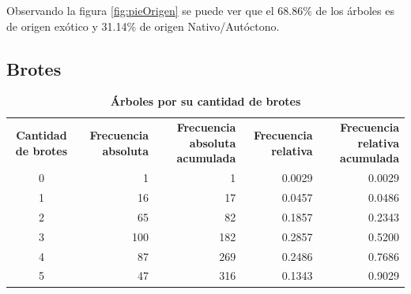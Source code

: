 \documentclass[11pt]{article}
\begin{document}
\begin{justify}
  Observando la figura \ref{fig:pieOrigen} se puede ver que el 68.86\% de los
  árboles es de origen exótico y 31.14\% de origen Nativo/Autóctono.
\end{justify}


\newpage
\subsection{Brotes}

\begin{table}[h!]
  \begin{center}
    \caption*{\textbf{Árboles por su cantidad de brotes}}
    \begin{tabular}{| c | r | r | r | r |}
      \hline
      \multirow{3}{3cm}{\centering\textbf{Cantidad de brotes}}              &
      \multirow{3}{2.5cm}{\centering\textbf{Frecuencia absoluta}}           &
      \multirow{3}{2.5cm}{\centering\textbf{Frecuencia absoluta acumulada}} &
      \multirow{3}{2.5cm}{\centering\textbf{Frecuencia relativa}}           &
      \multirow{3}{2.5cm}{\centering\textbf{Frecuencia relativa acumulada}}                                            \\
                                                                            &              &     &            &        \\
                                                                            &              &     &            &        \\ \hline
      0                                                                     & 1            & 1   & 0.0029     & 0.0029 \\ \hline
      1                                                                     & 16           & 17  & 0.0457     & 0.0486 \\ \hline
      2                                                                     & 65           & 82  & 0.1857     & 0.2343 \\ \hline
      3                                                                     & 100          & 182 & 0.2857     & 0.5200 \\ \hline
      4                                                                     & 87           & 269 & 0.2486     & 0.7686 \\ \hline
      5                                                                     & 47           & 316 & 0.1343     & 0.9029 \\ \hline

\end{tabular}
\end{center}
\end{table}
\end{document}
